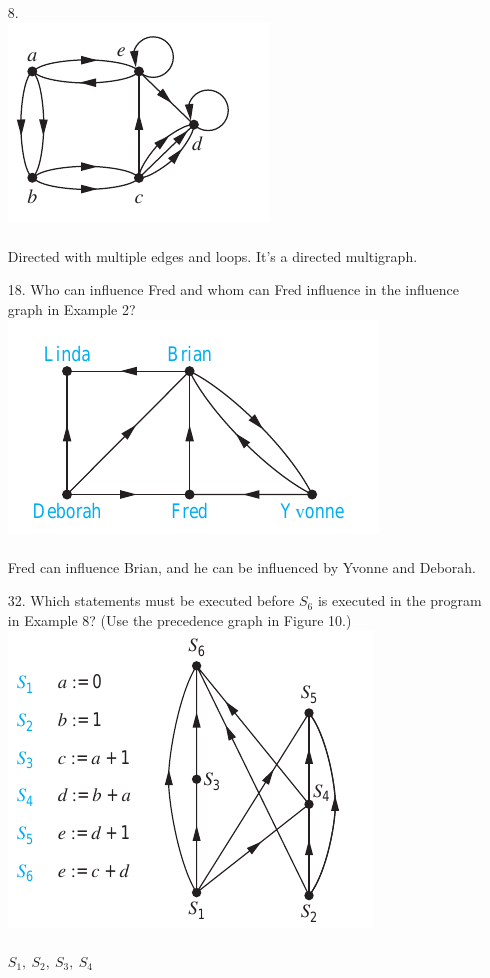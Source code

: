 \begin{itemize}
      \item[8.] \text{} \\
            \includegraphics[scale = 0.7]{img/10_1_8_graph.png} \\
            \answer \\
            Directed with multiple edges and loops. It's a directed multigraph.

      \item[18.] Who can influence Fred and whom can Fred influence in
            the influence graph in Example 2? \\
            \includegraphics[scale = 0.7]{img/10_1_18_graph.png} \\
            \answer \\
            Fred can influence Brian, and he can be influenced by Yvonne and Deborah.
      \item[32.]  Which statements must be executed before $S_6$ is executed
            in the program in Example 8? (Use the precedence graph in Figure 10.)\\
            \includegraphics[scale = 0.7]{img/10_1_32_graph.png} \\
            \answer \\
            $S_1,\ S_2,\ S_3,\ S_4$
\end{itemize}

